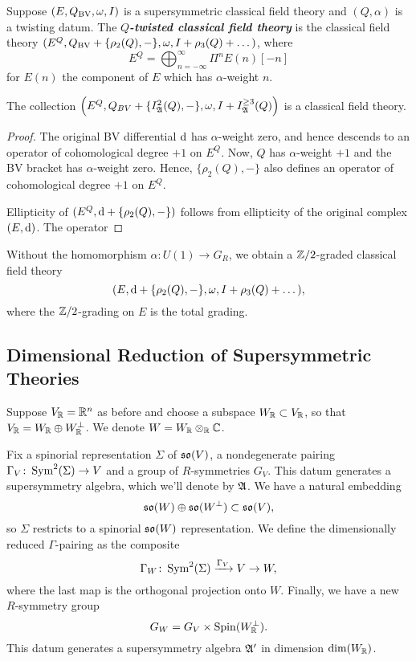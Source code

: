 \documentclass[10pt, oneside]{article}
\newcommand{\defterm}[1]{\textbf{\emph{#1}}}
\begin{document}
\begin{definition} \label{def:twisting}
Suppose $(E, Q_{\mathrm{BV}}, \omega, I)$ is a supersymmetric classical field theory and $(Q, \alpha)$ is a twisting datum. The \defterm{$Q$-twisted classical field theory} is the classical field theory $(E^Q, Q_{\mathrm{BV}} + \{\rho_2(Q), -\}, \omega, I + \rho_3(Q) + \dots)$, where
\[E^Q = \bigoplus_{n=-\infty}^\infty \Pi^n E(n)[-n]\]
for $E(n)$ the component of $E$ which has $\alpha$-weight $n$.
\end{definition}

\begin{prop}
The collection $\left(E^Q, Q_{BV} + \{I^2_{\mathfrak A} (Q), -\}, \omega, I + I^{\geq 3}_\mathfrak A (Q)\right)$ is a classical field theory.
\end{prop}

\begin{proof}
The original BV differential ${\rm d}$ has $\alpha$-weight zero, and hence descends to an operator of cohomological degree $+1$ on $E^Q$. 
Now, $Q$ has $\alpha$-weight $+1$ and the BV bracket has $\alpha$-weight zero. 
Hence, $\{\rho_{2}(Q), -\}$ also defines an operator of cohomological degree $+1$ on $E^Q$. 

Ellipticity of $(E^Q, {\rm d} + \{\rho_2 (Q), -\})$ follows from ellipticity of the original complex $(E, {\rm d})$.
The operator 
\end{proof}


\begin{remark}
Without the homomorphism $\alpha : U(1) \to G_R$, we obtain a $\mathbb Z/2$-graded classical field theory
\[(E, {\rm d} + \{\rho_2(Q), -\}, \omega, I + \rho_3(Q) + \dots),\]
where the $\mathbb Z/2$-grading on $E$ is the total grading.
\end{remark}

\subsection{Dimensional Reduction of Supersymmetric Theories}

Suppose $V_\mathbb R=\mathbb R^n$ as before and choose a subspace $W_\mathbb R\subset V_\mathbb R$, so that $V_\mathbb R = W_\mathbb R\oplus W^\perp_\mathbb R$. We denote $W=W_{\mathbb R}\otimes_{\mathbb R} \mathbb C$.

Fix a spinorial representation $\Sigma$ of $\mathfrak{so}(V)$, a nondegenerate pairing $\Gamma_V\colon \operatorname{Sym}^2(\Sigma)\rightarrow V$ and a group of $R$-symmetries $G_V$.  This datum generates a supersymmetry algebra, which we'll denote by $\mathfrak{A}$.  We have a natural embedding
\[\mathfrak{so}(W)\oplus \mathfrak{so}(W^{\perp})\subset \mathfrak{so}(V),\]
so $\Sigma$ restricts to a spinorial $\mathfrak{so}(W)$ representation. We define the dimensionally reduced $\Gamma$-pairing as the composite
\[\Gamma_W\colon \operatorname{Sym}^2(\Sigma)\xrightarrow{\Gamma_V} V\rightarrow W,\]
where the last map is the orthogonal projection onto $W$. Finally, we have a new $R$-symmetry group
\[G_W = G_V\times \mathrm{Spin}(W^\perp_\mathbb R).\]
This datum generates a supersymmetry algebra $\mathfrak{A}'$ in dimension $\mathrm{dim}(W_\mathbb R)$.
\end{document}
